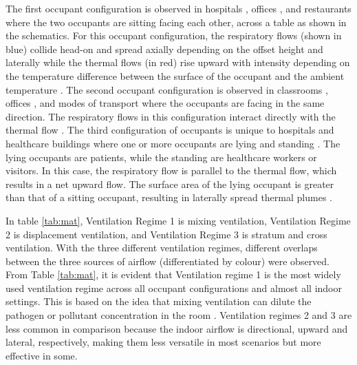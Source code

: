 \documentclass[a4paper,12pt]{elsarticle}
\begin{document}
The first occupant configuration is observed in hospitals \cite{zhou2021experimental}, offices \cite{li2023numerical}, and restaurants \cite{oksanen2022combining} where the two occupants are sitting facing each other, across a table as shown in the schematics. For this occupant configuration, the respiratory flows (shown in blue) collide head-on and spread axially depending on the offset height and laterally \cite{giri2022colliding, singhal2022virus} while the thermal flows (in red) rise upward with intensity depending on the temperature difference between the surface of the occupant and the ambient temperature \cite{zhang2019distribution}. The second occupant configuration is observed in classrooms \cite{qin2023transmission}, offices \cite{he2011cfd}, and modes of transport \cite{yan2021transmission,ho2021modeling} where the occupants are facing in the same direction. The respiratory flows in this configuration interact directly with the thermal flow \cite{ou2022insufficient}. The third configuration of occupants is unique to hospitals and healthcare buildings where one or more occupants are lying and standing \cite{villafruela2019assessment, lu2020reducing}. The lying occupants are patients, while the standing are healthcare workers or visitors. In this case, the respiratory flow is parallel to the thermal flow, which results in a net upward flow. The surface area of the lying occupant is greater than that of a sitting occupant, resulting in laterally spread thermal plumes \cite{feng2020influence}.

In table \ref{tab:mat}, Ventilation Regime 1 is mixing ventilation, Ventilation Regime 2 is displacement ventilation, and Ventilation Regime 3 is stratum and cross ventilation. With the three different ventilation regimes, different overlaps between the three sources of airflow (differentiated by colour) were observed. From Table \ref{tab:mat}, it is evident that Ventilation regime 1 is the most widely used ventilation regime across all occupant configurations and almost all indoor settings. This is based on the idea that mixing ventilation can dilute the pathogen or pollutant concentration in the room \cite{srivastava2021effective}. Ventilation regimes 2 and 3 are less common in comparison because the indoor airflow is directional, upward and lateral, respectively, making them less versatile in most scenarios but more effective in some.
\end{document}
